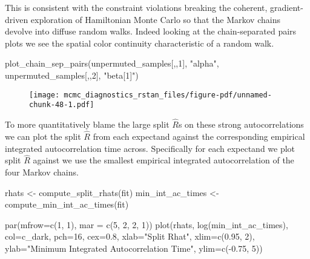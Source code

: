 \documentclass[
  letterpaper,
  DIV=11,
  numbers=noendperiod]{scrartcl}
\newenvironment{Shaded}{\begin{snugshade}}{\end{snugshade}}
\newcommand{\AttributeTok}[1]{\textcolor[rgb]{0.40,0.45,0.13}{#1}}
\newcommand{\DecValTok}[1]{\textcolor[rgb]{0.68,0.00,0.00}{#1}}
\newcommand{\FloatTok}[1]{\textcolor[rgb]{0.68,0.00,0.00}{#1}}
\newcommand{\FunctionTok}[1]{\textcolor[rgb]{0.28,0.35,0.67}{#1}}
\newcommand{\NormalTok}[1]{\textcolor[rgb]{0.00,0.23,0.31}{#1}}
\newcommand{\OtherTok}[1]{\textcolor[rgb]{0.00,0.23,0.31}{#1}}
\newcommand{\SpecialCharTok}[1]{\textcolor[rgb]{0.37,0.37,0.37}{#1}}
\newcommand{\StringTok}[1]{\textcolor[rgb]{0.13,0.47,0.30}{#1}}
\begin{document}
This is consistent with the constraint violations breaking the coherent,
gradient-driven exploration of Hamiltonian Monte Carlo so that the
Markov chains devolve into diffuse random walks. Indeed looking at the
chain-separated pairs plots we see the spatial color continuity
characteristic of a random walk.

\begin{Shaded}
\begin{Highlighting}[]
\FunctionTok{plot\_chain\_sep\_pairs}\NormalTok{(unpermuted\_samples[,,}\DecValTok{1}\NormalTok{], }\StringTok{"alpha"}\NormalTok{, unpermuted\_samples[,,}\DecValTok{2}\NormalTok{], }\StringTok{"beta[1]"}\NormalTok{)}
\end{Highlighting}
\end{Shaded}

\begin{figure}[H]

{\centering \texttt{[image: mcmc\_diagnostics\_rstan\_files/figure-pdf/unnamed-chunk-48-1.pdf]}

}

\end{figure}

To more quantitatively blame the large split \(\hat{R}\)s on these
strong autocorrelations we can plot the split \(\hat{R}\) from each
expectand against the corresponding empirical integrated autocorrelation
time across. Specifically for each expectand we plot split \(\hat{R}\)
against we use the smallest empirical integrated autocorrelation of the
four Markov chains.

\begin{Shaded}
\begin{Highlighting}[]
\NormalTok{rhats }\OtherTok{\textless{}{-}} \FunctionTok{compute\_split\_rhats}\NormalTok{(fit)}
\NormalTok{min\_int\_ac\_times }\OtherTok{\textless{}{-}} \FunctionTok{compute\_min\_int\_ac\_times}\NormalTok{(fit)}

\FunctionTok{par}\NormalTok{(}\AttributeTok{mfrow=}\FunctionTok{c}\NormalTok{(}\DecValTok{1}\NormalTok{, }\DecValTok{1}\NormalTok{), }\AttributeTok{mar =} \FunctionTok{c}\NormalTok{(}\DecValTok{5}\NormalTok{, }\DecValTok{2}\NormalTok{, }\DecValTok{2}\NormalTok{, }\DecValTok{1}\NormalTok{))}
\FunctionTok{plot}\NormalTok{(rhats, }\FunctionTok{log}\NormalTok{(min\_int\_ac\_times),}
     \AttributeTok{col=}\NormalTok{c\_dark, }\AttributeTok{pch=}\DecValTok{16}\NormalTok{, }\AttributeTok{cex=}\FloatTok{0.8}\NormalTok{,}
     \AttributeTok{xlab=}\StringTok{"Split Rhat"}\NormalTok{, }\AttributeTok{xlim=}\FunctionTok{c}\NormalTok{(}\FloatTok{0.95}\NormalTok{, }\DecValTok{2}\NormalTok{),}
     \AttributeTok{ylab=}\StringTok{"Minimum Integrated Autocorrelation Time"}\NormalTok{, }\AttributeTok{ylim=}\FunctionTok{c}\NormalTok{(}\SpecialCharTok{{-}}\FloatTok{0.75}\NormalTok{, }\DecValTok{5}\NormalTok{))}
\end{Highlighting}
\end{Shaded}
\end{document}
